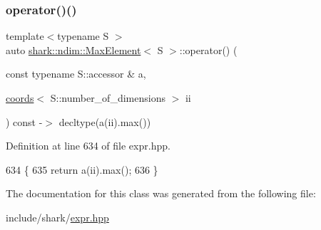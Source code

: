 \subsubsection{\texorpdfstring{operator()()}{operator()()}}
{\footnotesize\ttfamily template$<$typename S $>$ \\
auto \hyperlink{classshark_1_1ndim_1_1_max_element}{shark\+::ndim\+::\+Max\+Element}$<$ S $>$\+::operator() (\begin{DoxyParamCaption}\item[{const typename S\+::accessor \&}]{a,  }\item[{\hyperlink{structshark_1_1ndim_1_1coords}{coords}$<$ S\+::number\+\_\+of\+\_\+dimensions $>$}]{ii }\end{DoxyParamCaption}) const -\/$>$ decltype(a(ii).max()) \hspace{0.3cm}{\ttfamily [inline]}}



Definition at line 634 of file expr.\+hpp.


\begin{DoxyCode}
634                                                                                                            
                     \{
635                 \textcolor{keywordflow}{return} a(ii).max();
636             \}
\end{DoxyCode}


The documentation for this class was generated from the following file\+:\begin{DoxyCompactItemize}
\item 
include/shark/\hyperlink{expr_8hpp}{expr.\+hpp}\end{DoxyCompactItemize}
